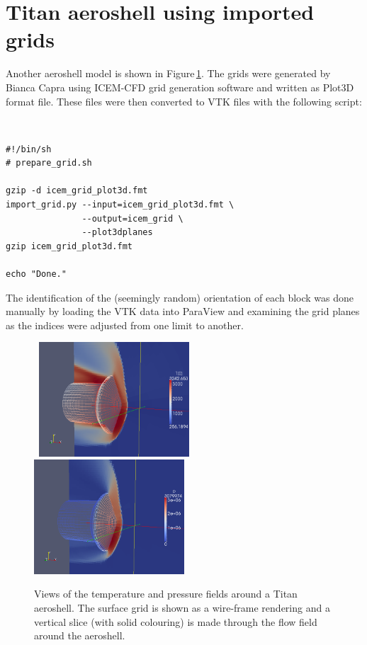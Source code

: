 \section{Titan aeroshell using imported grids}
\label{titan-aeroshell-sec}
%
Another aeroshell model is shown in Figure\,\ref{bianca-aeroshell-fig}.
The grids were generated by Bianca Capra using ICEM-CFD grid generation
software and written as Plot3D format file.
These files were then converted to VTK files with the following script:

\noindent
\baselineskip=1.0pc
\topbar\\
\begin{verbatim}
#!/bin/sh
# prepare_grid.sh

gzip -d icem_grid_plot3d.fmt
import_grid.py --input=icem_grid_plot3d.fmt \
               --output=icem_grid \
               --plot3dplanes
gzip icem_grid_plot3d.fmt

echo "Done."
\end{verbatim}
\bottombar

\baselineskip=1.5pc
\medskip
The identification of the (seemingly random) orientation of each block
was done manually by loading the VTK data into ParaView and examining the grid
planes as the indices were adjusted from one limit to another.


\begin{figure}[htbp]
\mbox{
\includegraphics[width=0.5\textwidth]{../3D/bianca-epfl/titan-T-field-with-surface-mesh.png}
\includegraphics[width=0.5\textwidth]{../3D/bianca-epfl/titan-p-field-with-surface-mesh.png}
}
\caption{Views of the temperature and pressure fields around a Titan aeroshell.
  The surface grid is shown as a wire-frame rendering and a vertical slice (with solid colouring)
  is made through the flow field around the aeroshell.}
\label{bianca-aeroshell-fig}
\end{figure}


